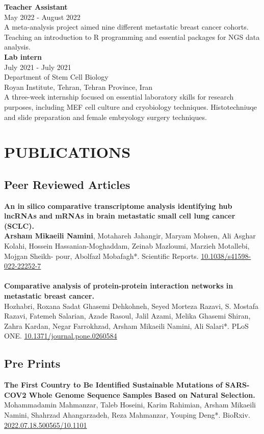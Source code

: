 \documentclass[a4paper,9pt]{extarticle}
\begin{document}
\noindent
\textbf{Teacher Assistant} \\
May 2022 - August 2022 \\
A meta-analysis project aimed nine different metastatic breast cancer cohorts.
Teaching an introduction to R programming and essential packages for NGS data analysis.\\

\noindent
\textbf{Lab intern} \\
July 2021 - July 2021 \\
Department of Stem Cell Biology  \\
Royan Institute, Tehran, Tehran Province, Iran\\
A three-week internship focused on essential laboratory skills for research purposes, including MEF cell culture and cryobiology techniques. Histotechniuqe and slide preparation and female embryology surgery techniques. 


\section*{PUBLICATIONS}
 
\subsection*{Peer Reviewed Articles}
\textbf{An in silico comparative transcriptome analysis identifying hub lncRNAs and mRNAs in brain metastatic small cell lung cancer (SCLC).} \\ 
\textbf{Arsham Mikaeili Namini}, Motahareh Jahangir, Maryam Mohsen, Ali Asghar Kolahi, Hossein Hassanian-Moghaddam, Zeinab Mazloumi, Marzieh Motallebi, Mojgan Sheikh- pour, Abolfazl Mobafagh*. Scientific Reports.  \href{https://www.nature.com/articles/s41598-022-22252-7}{10.1038/s41598-022-22252-7}\\
\\
\textbf{Comparative analysis of protein-protein interaction networks in metastatic breast cancer.} \\ 
Hozhabri, Roxana Sadat Ghasemi Dehkohneh, Seyed Morteza Razavi, S. Mostafa Razavi, Fatemeh Salarian, Azade Rasoul, Jalil Azami, Melika Ghasemi Shiran, Zahra Kardan, Negar Farrokhzad, Arsham Mikaeili Namini, Ali Salari*. PLoS ONE. \href{https://doi.org/10.1371/journal.pone.0260584}{10.1371/journal.pone.0260584}

\subsection*{Pre Prints}
\textbf{The First Country to Be Identified Sustainable Mutations of SARS-COV2 Whole Genome Sequence Samples Based on Natural Selection.} \\ 
Mohammadamin Mahmanzar, Taleb Hoseini, Karim Rahimian, Arsham Mikaeili Namini, Shahrzad Ahangarzadeh, Reza Mahmanzar, Youping Deng*. BioRxiv. \href{https://doi.org/10.1101/2022.07.18.500565}{2022.07.18.500565/10.1101}
\end{document}
